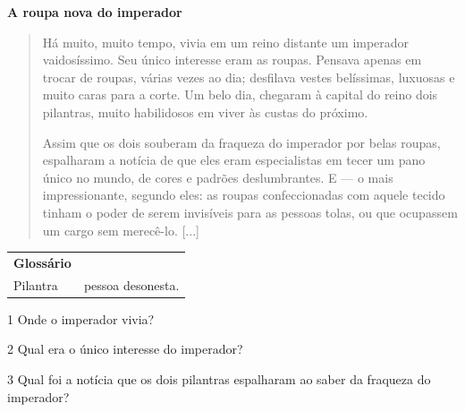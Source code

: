 \textbf{A roupa nova do imperador}



\begin{quote}
Há muito, muito tempo, vivia em um reino distante um imperador
vaidosíssimo. Seu único interesse eram as roupas. Pensava apenas em
trocar de roupas, várias vezes ao dia; desfilava vestes belíssimas,
luxuosas e muito caras para a corte. Um belo dia, chegaram à capital do
reino dois pilantras, muito habilidosos em viver às custas do próximo.

Assim que os dois souberam da fraqueza do imperador por belas roupas,
espalharam a notícia de que eles eram especialistas em tecer um pano
único no mundo, de cores e padrões deslumbrantes. E --- o mais
impressionante, segundo eles: as roupas confeccionadas com aquele tecido
tinham o poder de serem invisíveis para as pessoas tolas, ou que
ocupassem um cargo sem merecê-lo. {[}...{]}
\end{quote}



\begin{tabular}{ll}
\textbf{Glossário} & \mbox{}\\
Pilantra & pessoa desonesta.\\
\end{tabular}

\num{1} Onde o imperador vivia?


\num{2} Qual era o único interesse do imperador?


\num{3} Qual foi a notícia que os dois pilantras espalharam 
ao saber da fraqueza do imperador?


